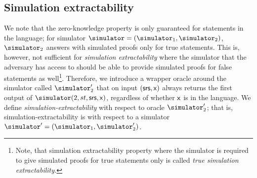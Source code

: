 \subsection{Simulation extractability}
We note that the zero-knowledge property is only guaranteed for statements in the
language; for simulator $\simulator = (\simulator_1, \simulator_2)$, $\simulator_2$
answers with simulated proofs only for true statements.  This is, however, not sufficient
for \emph{simulation extractability} where the simulator that the adversary has access to
should be able to provide simulated proofs for false statements as well\footnote{Note,
  that simulation extractability property where the simulator is required to give
  simulated proofs for true statements only is called \emph{true simulation
    extractability.}}. Therefore, we introduce a wrapper oracle around the simulator
called $\simulator'_2$ that on input $(\mathsf{srs}, \mathsf{x})$ always returns the first output of
$\simulator (2, st, \srs, \inp)$, regardless of whether $\mathsf{x}$ is in the language. We
define \emph{simulation-extractability} with respect to oracle $\simulator_2'$; that is,
simulation-extractability is with respect to a simulator
$\simulator' = (\simulator_1, \simulator_2')$.
%
